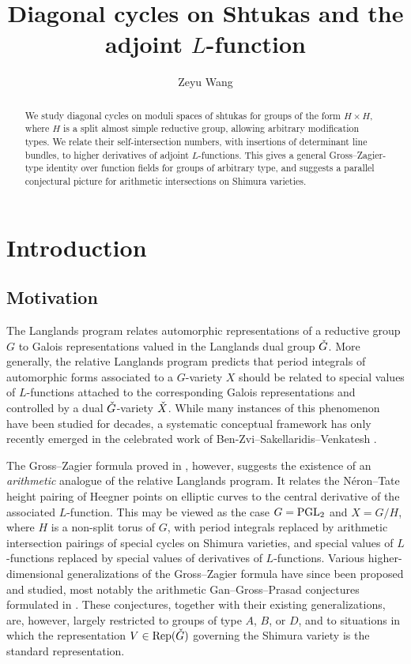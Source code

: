 \documentclass[reqno]{amsart}
\title{Diagonal cycles on Shtukas and the adjoint $L$-function}
\author{Zeyu Wang}
\numberwithin{equation}{section}
\numberwithin{equation}{section}
\begin{document}
\begin{abstract}
We study diagonal cycles on moduli spaces of shtukas for groups of the form $H\times H$, where $H$ is a split almost simple reductive group, allowing arbitrary modification types. We relate their self-intersection numbers, with insertions of determinant line bundles, to higher derivatives of adjoint $L$-functions. This gives a general Gross--Zagier-type identity over function fields for groups of arbitrary type, and suggests a parallel conjectural picture for arithmetic intersections on Shimura varieties.
\end{abstract}


\maketitle
\tableofcontents

\section{Introduction}
\subsection{Motivation}

The Langlands program relates automorphic representations of a reductive group $G$ to Galois representations valued in the Langlands dual group $\check{G}$. More generally, the relative Langlands program predicts that period integrals of automorphic forms associated to a $G$-variety $X$ should be related to special values of $L$-functions attached to the corresponding Galois representations and controlled by a dual $\check{G}$-variety $\check{X}$. While many instances of this phenomenon have been studied for decades, a systematic conceptual framework has only recently emerged in the celebrated work of Ben-Zvi--Sakellaridis--Venkatesh \cite{BZSV}.

The Gross--Zagier formula proved in \cite{gross1986heegner}, however, suggests the existence of an \emph{arithmetic} analogue of the relative Langlands program. It relates the N\'eron--Tate height pairing of Heegner points on elliptic curves to the central derivative of the associated $L$-function. This may be viewed as the case $G=\operatorname{PGL}_2$ and $X=G/H$, where $H$ is a non-split torus of $G$, with period integrals replaced by arithmetic intersection pairings of special cycles on Shimura varieties, and special values of $L$-functions replaced by special values of derivatives of $L$-functions. Various higher-dimensional generalizations of the Gross--Zagier formula have since been proposed and studied, most notably the arithmetic Gan--Gross--Prasad conjectures formulated in \cite{gan2012symplectic}. These conjectures, together with their existing generalizations, are, however, largely restricted to groups of type $A$, $B$, or $D$, and to situations in which the representation $V\in \operatorname{Rep}(\check{G})$ governing the Shimura variety is the standard representation. 
\end{document}
